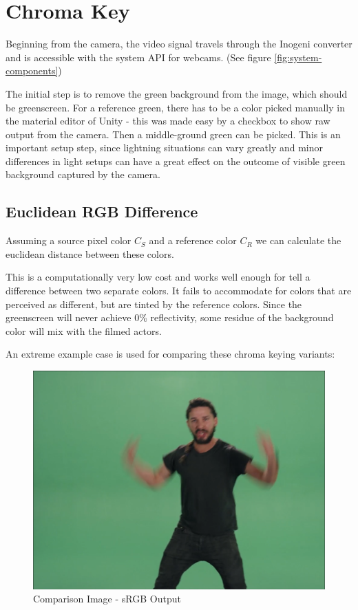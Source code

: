 \section{Chroma Key}

Beginning from the camera, the video signal travels through the Inogeni 
converter and is accessible with the system API for webcams. 
(See figure \ref{fig:system-components})

The initial step is to remove the green background from the image, which should 
be greenscreen. For a reference green, there has to be a color picked 
manually in the material editor of Unity - this was made easy by a checkbox to 
show raw output from the camera. Then a middle-ground green can be 
picked. This is an important setup step, since lightning situations can vary 
greatly and minor differences in light setups can have a great effect on the 
outcome of visible green background captured by the camera.
\newline
\subsection{Euclidean RGB Difference}
Assuming a source pixel color $C_S$ and a reference color $C_R$ we can 
calculate the euclidean distance between these colors.

This is a computationally very low cost and works well enough for tell a 
difference between two separate colors. It fails to accommodate for colors that 
are perceived as different, but are tinted by the reference colors. Since the 
greenscreen will never achieve 0\% reflectivity, some residue of the background 
color will mix with the filmed actors.

An extreme example case is used for comparing these chroma keying variants:

\begin{figure}[htb]
	\includegraphics[width=\textwidth]{_raw_resources/Comparison_Example.png}
	\caption{Comparison Image - sRGB Output}
	\label{fig:chroma:color}
\end{figure}

